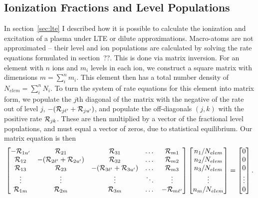 

\subsection{Ionization Fractions and Level Populations}

In section~\ref{sec:lte} I described how it is possible to calculate the
ionization and excitation of a plasma under LTE or dilute approximations.
Macro-atoms are not approximated -- their level and ion populations are 
calculated by solving the rate equations formulated in section~??. 
This is done via matrix inversion. For an element with $n$ ions and $m_i$
levels in each ion, we construct a square matrix with dimensions 
$m = \sum_i^n m_i$.
This element then has a total number density of $N_{elem} = \sum_i^n N_i$.
To turn the system of rate equations for this element into matrix form, we
populate the $j$th diagonal of the matrix with the negative of the rate out of
level $j$, $-({\cal R}_{j{\ell^\prime}} + {\cal R}_{j{u^\prime}})$, 
and populate the off-diagonals $(j,k)$ with the positive rate 
${\cal R}_{jk}$. These are then multiplied by a vector of the fractional level
populations, and must equal a vector of zeros, due to statistical equilibrium.
Our matrix equation is then
%
\begin{equation}
\begin{bmatrix}
    -{\cal R}_{1{u^\prime}} & {\cal R}_{21} & {\cal R}_{31} & \dots & {\cal R}_{m1} \\
    {\cal R}_{12} & -({\cal R}_{2{\ell^\prime}} + {\cal R}_{2{u^\prime}}) & {\cal R}_{32} & \dots & {\cal R}_{m2} \\
    {\cal R}_{13}  & {\cal R}_{23} & -({\cal R}_{3{\ell^\prime}} + {\cal R}_{3{u^\prime}}) & \dots & {\cal R}_{m3} \\
    \vdots & \vdots & \vdots & \ddots & \vdots \\
    {\cal R}_{1m}      & {\cal R}_{2m} & {\cal R}_{3m} & \dots & -{\cal R}_{m{\ell^\prime}}
\end{bmatrix}
\begin{bmatrix}
    n_1 / N_{elem} \\
    n_2 / N_{elem} \\
    n_3 / N_{elem} \\
    \vdots         \\
    n_m / N_{elem} 
\end{bmatrix}
=
\begin{bmatrix}
    0 \\
    0 \\
    0 \\
    \vdots \\
    0
\end{bmatrix}
.
\end{equation}
